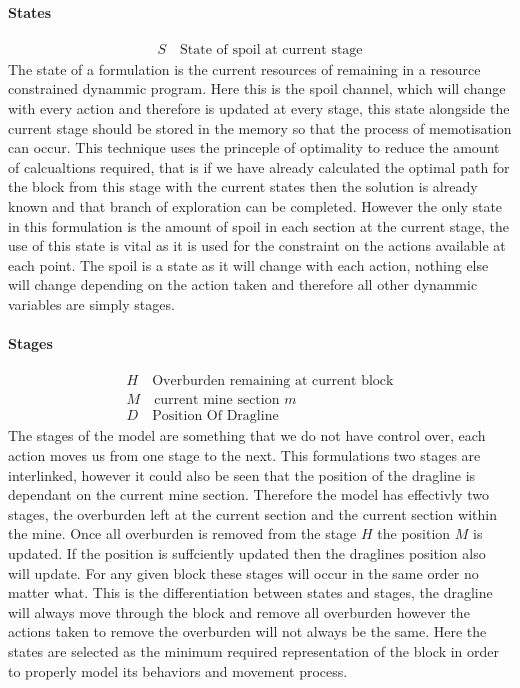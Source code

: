 \paragraph*{States}
\begin{align}
\label{state1}
S \quad \text{State of spoil at current stage}
\end{align}
The state of a formulation is the current resources of remaining in a resource constrained dynammic program. Here this is the spoil channel, which will change with every action and therefore is updated at every stage, this state alongside the current stage should be stored in the memory so that the process of memotisation can occur. This technique uses the princeple of optimality to reduce the amount of calcualtions required, that is if we have already calculated the optimal path for the block from this stage with the current states then the solution is already known and that branch of exploration can be completed. However the only state in this formulation is the amount of spoil in each section at the current stage, the use of this state is vital as it is used for the constraint on the actions available at each point. The spoil is a state as it will change with each action, nothing else will change depending on the action taken and therefore all other dynammic variables are simply stages. 
\paragraph*{Stages}
\begin{align}
\label{DP:Stage0}
H \quad \text{Overburden remaining at current block}\\
\label{DP:Stage1}
M \quad \text{current mine section }m \\ 
\label{DP:stage2}
D \quad \text{Position Of Dragline}
\end{align}
The stages of the model are something that we do not have control over, each action moves us from one stage to the next. This formulations two stages are interlinked, however it could also be seen that the position of the dragline is dependant on the current mine section. Therefore the model has effectivly two stages, the overburden left at the current section and the current section within the mine. Once all overburden is removed from the stage $H$ the position $M$ is updated. If the position is suffciently updated then the draglines position also will update. For any given block these stages will occur in the same order no matter what. This is the differentiation between states and stages, the dragline will always move through the block and remove all overburden however the actions taken to remove the overburden will not always be the same. Here the states are selected as the minimum required representation of the block in order to properly model its behaviors and movement process. 	
